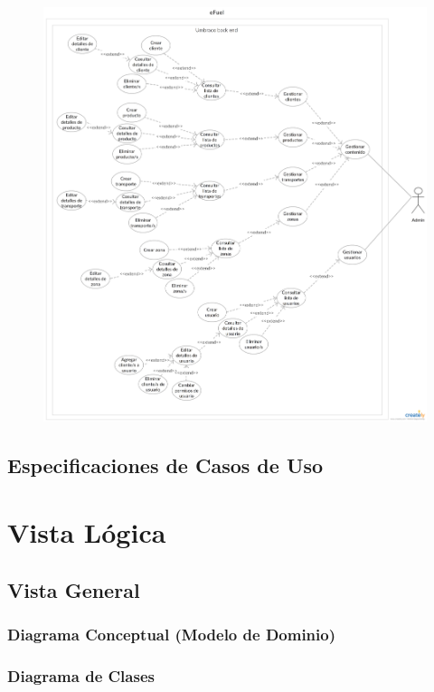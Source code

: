\documentclass{article}
\begin{document}
    \begin{figure}[H]
        \includegraphics[width=\textwidth]{eFuelBN.jpg}
        \centering
    \end{figure}

    \subsection{Especificaciones de Casos de Uso}

    \section{Vista Lógica} \label{vistaLogica}
    \subsection{Vista General}
    \subsubsection{Diagrama Conceptual (Modelo de Dominio)}
    \subsubsection{Diagrama de Clases}
\end{document}
